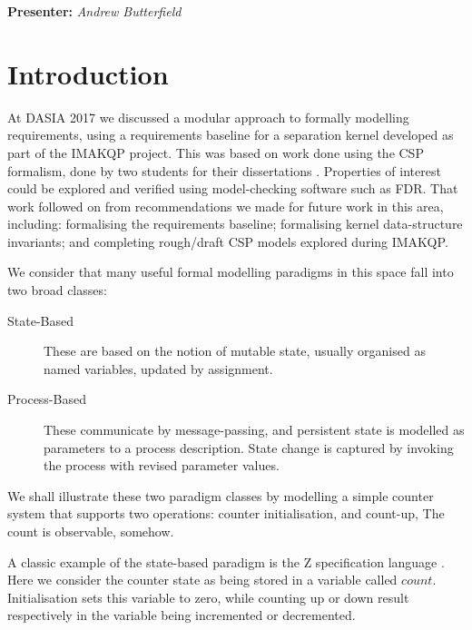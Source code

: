 
\begin{center}
\textbf{Presenter:} \emph{Andrew Butterfield}
\end{center}

\section{Introduction}

At DASIA 2017\cite{Lero-DASIA17}
we discussed a modular approach to formally modelling
requirements, using a requirements baseline for a separation kernel developed
as part of the IMAKQP project\cite{IMAKQP-D02}.
This was based on work done using the CSP formalism\cite{hoare-1985:commuseque:},
done by two students for their dissertations \cite{KH-MCS2016,Costelloe17}.
Properties of interest could be explored and verified using
model-checking software such as FDR\cite{FDR3}.
That work followed on from recommendations we made for future work
in this area, including:
formalising the requirements baseline;
formalising kernel data-structure invariants;
and completing rough/draft CSP models explored during IMAKQP.

We consider that many useful formal modelling paradigms in this space
fall into two broad classes:
\begin{description}
  \item [State-Based]
    These are based on the notion of mutable state,
    usually organised as named variables, updated by assignment.
  \item [Process-Based]
    These communicate by message-passing, and persistent state
    is modelled as parameters to a process description.
    State change is captured by invoking the process with revised parameter values.
\end{description}
We shall illustrate these two paradigm classes by modelling a simple counter
system that supports two operations: counter initialisation, and count-up,
The count is observable, somehow.

A classic example of the state-based paradigm is
the Z specification language \cite{UsingZ}.
Here we consider the counter state as being stored
in a variable called $count$. Initialisation sets this variable to zero,
while counting up or down result respectively
in the variable being incremented or decremented.

